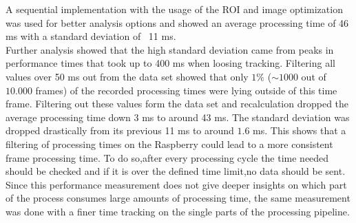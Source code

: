 A sequential implementation with the usage of the ROI and image optimization was used for better analysis options and showed an average processing time of 46 ms with a standard deviation of ~11 ms.\\
Further analysis showed that the high standard deviation came from peaks in performance times that took up to 400 ms when loosing tracking. Filtering all values over 50 ms out from the data set showed that only $1\%$ ($\sim 1000$ out of $10.000$ frames) of the recorded processing times were lying outside of this time frame. Filtering out these values form the data set and recalculation dropped the average processing time down 3 ms to around 43 ms. The standard deviation was dropped drastically from its previous 11 ms to around $1.6$ ms. This shows that a filtering of processing times on the Raspberry could lead to a more consistent frame processing time. To do so,after every processing cycle the time needed should be checked and if it is over the defined time limit,no data should be sent.\\
Since this performance measurement does not give deeper insights on which part of the process consumes large amounts of processing time, the same measurement was done with a finer time tracking on the single parts of the processing pipeline.
